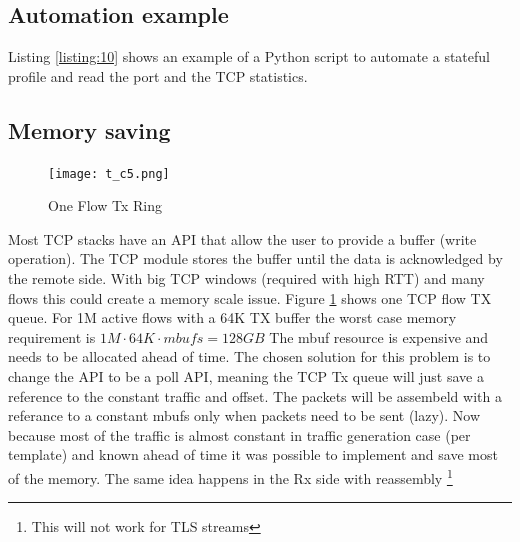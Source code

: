 \documentclass[conference]{IEEEtran}
\begin{document}
\subsection{Automation example}

Listing \ref{listing:10} shows an example of a Python script to automate a stateful profile and read the port and the TCP statistics.


\subsection{Memory saving}

\begin{figure}[h]
  \texttt{[image: t\_c5.png]}
  \caption{One Flow Tx Ring}
  \label{fig:tx_ring}
\end{figure}

Most TCP stacks have an API that allow the user to provide a buffer (write operation). 
The TCP module stores the buffer until the data is acknowledged by the remote side. 
With big TCP windows (required with high RTT) and many flows this could create a memory scale issue. 
Figure \ref{fig:tx_ring} shows one TCP flow TX queue. For 1M active flows with a 64K TX buffer 
the worst case memory requirement is $1M \cdot 64K \cdot  mbufs  = 128GB$
The mbuf resource is expensive and needs to be allocated ahead of time. 
The chosen solution for this problem is to change the API to be a poll API, 
meaning the TCP Tx queue will just save a reference to the constant traffic and offset. The packets will be assembeld with a referance to a constant mbufs only when packets need to be sent (lazy). 
Now because most of the traffic is almost constant in traffic generation case (per template) and known ahead of time it was possible to implement and save most of the memory.
The same idea happens in the Rx side with reassembly \footnote{This will not work for TLS streams}
\end{document}
